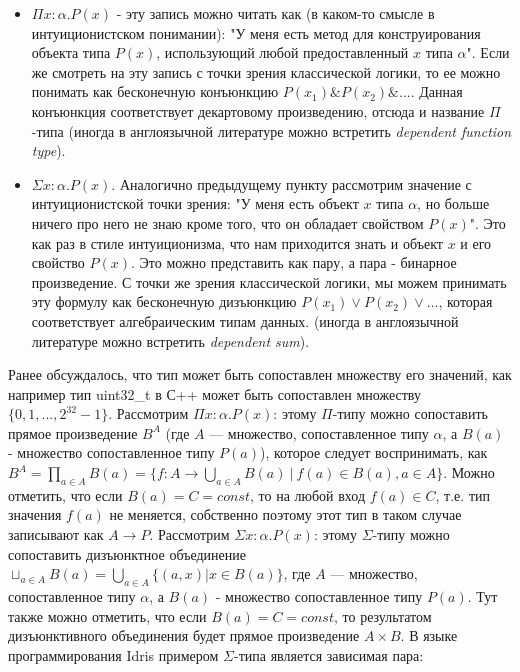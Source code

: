 \begin{itemize}
    \item $\Pi x : \alpha . P(x)$ - эту запись можно читать как (в каком-то смысле в интуиционистском понимании): "У меня есть метод для конструирования объекта типа $P(x)$, использующий любой предоставленный $x$ типа $\alpha$". Если же смотреть на эту запись с точки зрения классической логики, то ее можно понимать как бесконечную  конъюнкцию $P(x_1)\&P(x_2)\&...$. Данная конъюнкция соответствует декартовому произведению, отсюда и название $\Pi$-типа (иногда в англоязычной литературе можно встретить \textit{dependent function type}).
    \item $\Sigma x : \alpha . P(x)$. Аналогично предыдущему пункту рассмотрим значение с интуиционистской точки зрения: "У меня есть объект $x$ типа $\alpha$, но больше ничего про него не знаю кроме того, что он обладает свойством $P(x)$". Это как раз в стиле интуиционизма, что нам приходится знать и объект $x$ и его свойство $P(x)$. Это можно представить как пару, а пара - бинарное произведение. С точки же зрения классической логики, мы можем принимать эту формулу как бесконечную дизъюнкцию $P(x_1) \vee P(x_2)\vee ...$, которая соответствует алгебраическим типам данных. (иногда в англоязычной литературе можно встретить \textit{dependent sum}).
\end{itemize}

Ранее обсуждалось, что тип может быть сопоставлен множеству его значений, как например тип uint32\_t в С++ может быть сопоставлен множеству $\{0, 1, ..., 2^{32} - 1\}$. Рассмотрим $\Pi x : \alpha . P(x)$: этому $\Pi$-типу можно сопоставить прямое произведение $B^A$ (где $A$ --- множество, сопоставленное типу $\alpha$, а $B(a)$ - множество сопоставленное типу $P(a)$), которое следует воспринимать, как $B^A = \prod_{a \in A} B(a) = \{ f : A \rightarrow \bigcup_{a \in A} B(a)\ |\ f(a) \in B(a), a \in A  \}$. Можно отметить, что если $B(a) = C = const$, то на любой вход $f(a) \in C$, т.е. тип значения $f(a)$ не меняется, собственно поэтому этот тип в таком случае записывают как $A \rightarrow P$. Рассмотрим $\Sigma x : \alpha . P(x)$: этому $\Sigma$-типу можно сопоставить дизъюнктное объединение $\sqcup_{a \in A} B(a) = \bigcup_{a \in A}\{(a, x) | x \in B(a)\}$, где $A$ --- множество, сопоставленное типу $\alpha$, а $B(a)$ - множество сопоставленное типу $P(a)$. Тут также можно отметить, что если $B(a) = C = const$, то результатом дизъюнктивного объединения будет прямое произведение $A \times B$. В языке программирования Idris примером $\Sigma$-типа является зависимая пара:

